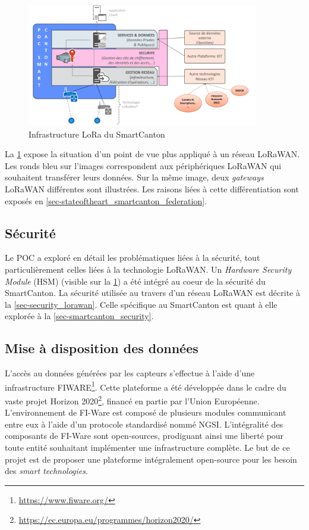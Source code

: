 \begin{figure}[ht!]
    \centering
    \includegraphics[width=0.9\textwidth]{Figures/StateOfTheArt/SmartCanton/infrastructure_smartcanton.png}
    \caption{Infrastructure LoRa du SmartCanton}
    \label{fig-infrastructure_smartcanton}
\end{figure}

La \cref{fig-infrastructure_smartcanton} expose la situation d'un point de vue plus appliqué à un réseau LoRaWAN. Les ronds bleu sur l'images correspondent aux périphériques LoRaWAN qui souhaitent transférer leurs données. Sur la même image, deux \textit{gateways} LoRaWAN différentes sont illustrées. Les raisons liées à cette différentiation sont exposés en \cref{sec-stateoftheart_smartcanton_federation}.


\subsection{Sécurité}


Le POC a exploré en détail les problématiques liées à la sécurité, tout particulièrement celles liées à la technologie LoRaWAN. Un \textit{Hardware Security Module} (HSM) (visible sur la \cref{fig-infrastructure_smartcanton}) a été intégré au coeur de la sécurité du SmartCanton. La sécurité utilisée au travers d'un réseau LoRaWAN est décrite à la \cref{sec-security_lorawan}. Celle spécifique au SmartCanton est quant à elle explorée à la \cref{sec-smartcanton_security}.



\subsection{Mise à disposition des données}


L'accès au données générées par les capteurs s'effectue à l'aide d'une infrastructure FIWARE\footnote{\url{https://www.fiware.org/}}. Cette plateforme a été développée dans le cadre du vaste projet Horizon 2020\footnote{\url{https://ec.europa.eu/programmes/horizon2020/}}, financé en partie par l'Union Européenne. 
L'environnement de FI-Ware est composé de plusieurs modules communicant entre eux à l'aide d'un protocole standardisé nommé NGSI. L'intégralité des composants de FI-Ware sont open-sources, prodiguant ainsi une liberté pour toute entité souhaitant implémenter une infrastructure complète.
Le but de ce projet est de proposer une plateforme intégralement open-source pour les besoin des \textit{smart technologies}. 


